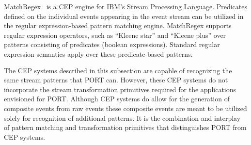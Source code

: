 MatchRegex~\cite{DBLP:conf/debs/Hirzel12} is a CEP engine for IBM’s Stream Processing
Language. Predicates defined on the individual events appearing in the event
stream can be utilized in the regular expression-based pattern matching
engine. MatchRegex supports regular expression operators, such as “Kleene star”
and “Kleene plus” over patterns consisting of predicates (boolean expressions).
Standard regular expression semantics apply over these predicate-based patterns.

The CEP systems described in this subsection are capable
of recognizing the same stream patterns that PORT can.
However, these CEP systems do not incorporate the
stream transformation primitives required for the applications
envisioned for PORT. Although CEP systems do allow for the
generation of composite events from raw events these composite events
are meant to be utilized solely for recognition of additional patterns.
It is the combination and interplay of pattern matching and transformation
primitives that distinguishes PORT from CEP systems.


